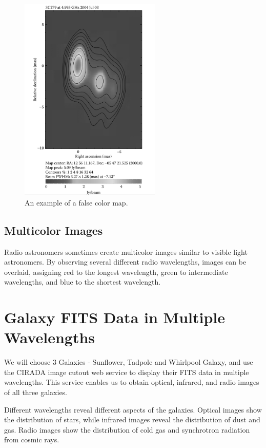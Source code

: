 \begin{figure}[H]
    \centering
    \includegraphics[width=0.6\textwidth]{Images/false_colour_map.png}
    \caption{An example of a false color map.}
    \label{fig:false_color_map}
\end{figure}

\subsection{Multicolor Images}

Radio astronomers sometimes create multicolor images similar to visible light astronomers. By observing several different radio wavelengths, images can be overlaid, assigning red to the longest wavelength, green to intermediate wavelengths, and blue to the shortest wavelength.


\clearpage

\section{Galaxy FITS Data in Multiple Wavelengths}

We will choose 3 Galaxies - Sunflower, Tadpole and Whirlpool Galaxy, and use the CIRADA \cite{cirada_cutout} image cutout web service to display their FITS\cite{fits_nasa} data in multiple wavelengths. This service enables us to obtain optical, infrared, and radio images of all three galaxies.

Different wavelengths reveal different aspects of the galaxies. Optical images show the distribution of stars, while infrared images reveal the distribution of dust and gas. Radio images show the distribution of cold gas and synchrotron radiation from cosmic rays.

